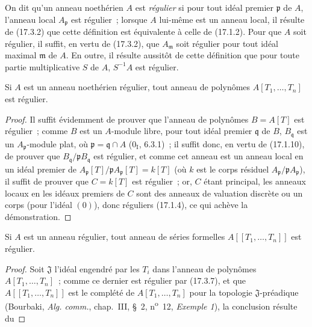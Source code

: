\begin{env}[17.3.6]
\label{0.17.3.6-fr}
On dit qu'un anneau noethérien $A$ est \emph{régulier} si pour tout idéal
premier $\mathfrak{p}$ de $A$, l'anneau local $A_{\mathfrak{p}}$ est
régulier~; lorsque $A$ lui-même est un anneau local, il résulte de (17.3.2)
que cette définition est équivalente à celle de (17.1.2). Pour que $A$ soit
régulier, il suffit, en vertu de (17.3.2), que $A_{\mathfrak{m}}$ soit
régulier pour tout idéal maximal $\mathfrak{m}$ de $A$. En outre, il résulte
aussitôt de cette définition que pour toute partie multiplicative $S$ de
$A$, $S^{-1}A$ est régulier.
\end{env}

\begin{proposition}[17.3.7]
\label{0.17.3.7-fr}
Si $A$ est un anneau noethérien régulier, tout anneau de polynômes
$A[T_1,\ldots,T_n]$ est régulier.
\end{proposition}

\begin{proof}
Il suffit évidemment de prouver que l'anneau de polynômes $B=A[T]$ est
régulier~; comme $B$ est un $A$-module libre, pour tout idéal premier
$\mathfrak{q}$ de $B$, $B_{\mathfrak{q}}$ est un
$A_{\mathfrak{p}}$-module plat, où $\mathfrak{p}=\mathfrak{q}\cap A$
($0_{\mathrm I}$, 6.3.1)~; il suffit donc, en vertu de (17.1.10), de prouver
que $B_{\mathfrak{q}}/\mathfrak{p}B_{\mathfrak{q}}$ est régulier, et comme
cet anneau est un anneau local en un idéal premier de
$A_{\mathfrak{p}}[T]/\mathfrak{p}A_{\mathfrak{p}}[T]=k[T]$ (où $k$ est le
corps résiduel $A_{\mathfrak{p}}/\mathfrak{p}A_{\mathfrak{p}}$), il suffit
de prouver que $C=k[T]$ est régulier~; or, $C$ étant principal, les anneaux
locaux en les idéaux premiers de $C$ sont des anneaux de valuation discrète
ou un corps (pour l'idéal $(0)$), donc réguliers (17.1.4), ce qui achève la
démonstration.
\end{proof}

\begin{corollary}[17.3.8]
\label{0.17.3.8-fr}
Si $A$ est un anneau régulier, tout anneau de séries formelles
$A[[T_1,\ldots,T_n]]$ est régulier.
\end{corollary}

\begin{proof}
Soit $\mathfrak{J}$ l'idéal engendré par les $T_i$ dans l'anneau de polynômes
$A[T_1,\ldots,T_n]$~; comme ce dernier est régulier par (17.3.7), et que
$A[[T_1,\ldots,T_n]]$ est le complété de $A[T_1,\ldots,T_n]$ pour la
topologie $\mathfrak{J}$-préadique (Bourbaki, \emph{Alg. comm.}, chap.~III,
\S~2, n\textsuperscript{o}~12, \emph{Exemple 1}), la conclusion résulte du
\end{proof}

